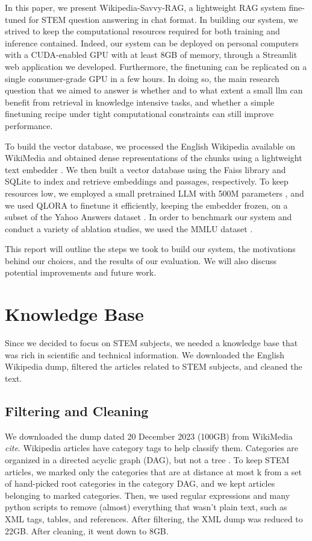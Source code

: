 \documentclass[11pt]{article}
\begin{document}
In this paper, we present Wikipedia-Savvy-RAG, a lightweight RAG system fine-tuned for STEM question answering
in chat format. In building our system, we strived to keep the computational resources required for both
training and inference contained. Indeed, our system can be deployed on personal computers with a CUDA-enabled GPU
with at least 8GB of memory, through a Streamlit web application we developed. Furthermore, the finetuning can 
be replicated on a single consumer-grade GPU in a few hours. In doing so, the main research question that we aimed to
answer is whether and to what extent a small llm can benefit from retrieval in knowledge intensive tasks, and whether a
simple finetuning recipe under tight computational constraints can still improve performance. 

To build the vector database, we processed the English Wikipedia available on WikiMedia \cite{wikimedia} and obtained 
dense representations of the chunks using a lightweight text embedder \cite{baai}. We then built a vector database using
the Faiss library \cite{faiss} and SQLite \cite{sqlite} to index and retrieve embeddings and passages, respectively. To keep resources low,
we employed a small pretrained LLM with 500M parameters \cite{qwen}, and we used QLORA \cite{qlora} to finetune it efficiently, 
keeping the embedder frozen, on a subset of the Yahoo Answers dataset \cite{yahoo_answers}.
In order to benchmark our system and conduct a variety of ablation studies, we used the MMLU dataset \cite{mmlu}.

This report will outline the steps we took to build our system, the motivations behind our choices, and the results of our evaluation.
We will also discuss potential improvements and future work.

\section{Knowledge Base}

Since we decided to focus on STEM subjects, we needed a knowledge base that was rich in scientific and technical information.
We downloaded the English Wikipedia dump, filtered the articles related to STEM subjects, and cleaned the text.

\subsection{Filtering and Cleaning}

We downloaded the dump dated 20 December 2023 (100GB) from WikiMedia \textit{cite}. Wikipedia articles have category tags to help classify them.
Categories are organized in a directed acyclic graph (DAG), but not a tree \cite{kaggle_categories_thing}. To keep STEM articles, we marked only the categories that are at
distance at most k from a set of hand-picked root categories in the category DAG, and we kept articles belonging to marked categories.
Then, we used regular expressions and many python scripts to remove (almost) everything that wasn't plain text, such as XML tags, tables, and references. After filtering, the XML
dump was reduced to 22GB. After cleaning, it went down to 8GB.
\end{document}
